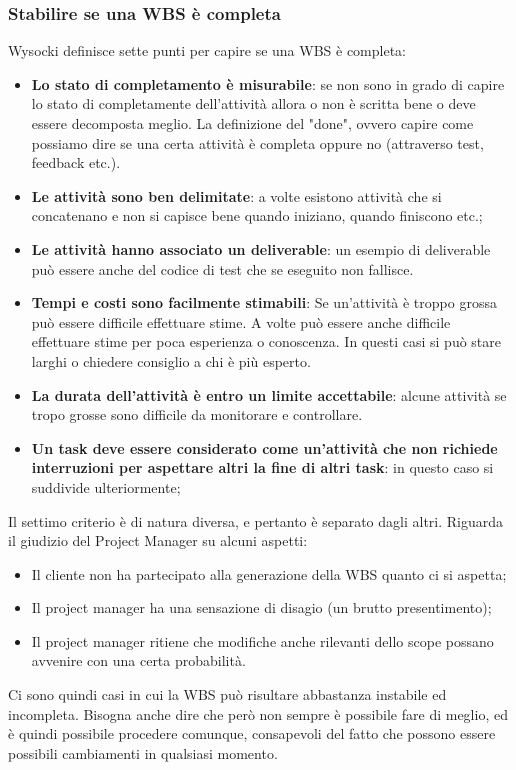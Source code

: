 \subsubsection{Stabilire se una WBS è completa}
Wysocki definisce sette punti per capire se una WBS è completa:
\begin{itemize}
	\item \textbf{Lo stato di completamento è misurabile}: se non sono in grado di capire lo stato di completamente dell'attività allora o non è scritta bene o deve essere decomposta meglio. La definizione del "done", ovvero capire come possiamo dire se una certa attività è completa oppure no (attraverso test, feedback etc.).
	\item \textbf{Le attività sono ben delimitate}: a volte esistono attività che si concatenano e non si capisce bene quando iniziano, quando finiscono etc.;
	\item \textbf{Le attività hanno associato un deliverable}: un esempio di deliverable può essere anche del codice di test che se eseguito non fallisce.
	\item \textbf{Tempi e costi sono facilmente stimabili}: Se un'attività è troppo grossa può essere difficile effettuare stime. A volte può essere anche difficile effettuare stime per poca esperienza o conoscenza. In questi casi si può stare larghi o chiedere consiglio a chi è più esperto.
	\item \textbf{La durata dell'attività è entro un limite accettabile}: alcune attività se tropo grosse sono difficile da monitorare e controllare.
	\item \textbf{Un task deve essere considerato come un'attività che non richiede interruzioni per aspettare altri la fine di altri task}: in questo caso si suddivide ulteriormente;
\end{itemize}

\noindent Il settimo criterio è di natura diversa, e pertanto è separato dagli altri. Riguarda il giudizio del Project Manager su alcuni aspetti:
\begin{itemize}
	\item Il cliente non ha partecipato alla generazione della WBS quanto ci si aspetta;
	\item Il project manager ha una sensazione di disagio (un brutto presentimento);
	\item Il project manager ritiene che modifiche anche rilevanti dello scope possano avvenire con una certa probabilità.
\end{itemize}
Ci sono quindi casi in cui la WBS può risultare abbastanza instabile ed incompleta. Bisogna anche dire che però non sempre è possibile fare di meglio, ed è quindi possibile procedere comunque, consapevoli del fatto che possono essere possibili cambiamenti in qualsiasi momento.

